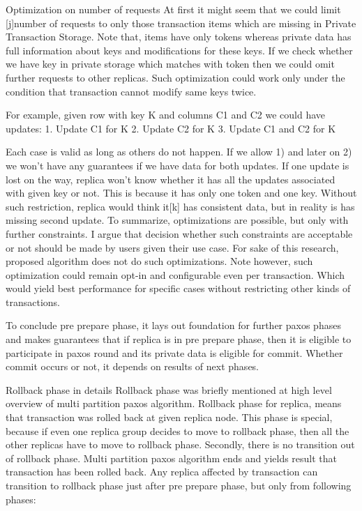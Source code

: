         Optimization on number of requests
At first it might seem that we could limit [j]number of requests to only those transaction items which are missing in Private Transaction Storage. Note that, items have only tokens whereas private data has full information about keys and modifications for these keys. If we check whether we have key in private storage which matches with token then we could omit further requests to other replicas. 
Such optimization could work only under the condition that transaction cannot modify same keys twice. 


For example, given row with key K and columns C1 and C2 we could have updates:
1. Update C1 for K
2. Update C2 for K
3. Update C1 and C2 for K


Each case is valid as long as others do not happen. If we allow 1) and later on 2) we won’t have any guarantees if we have data for both updates. If one update is lost on the way, replica won’t know whether it has all the updates associated with given key or not. This is because it has only one token and one key. Without such restriction, replica would think it[k] has consistent data, but in reality is has missing second update.
To summarize, optimizations are possible, but only with further constraints. I argue that decision whether such constraints are acceptable or not should be made by users given their use case. For sake of this research, proposed algorithm does not do such optimizations. Note however, such optimization could remain opt-in and configurable even per transaction. Which would yield best performance for specific cases without restricting other kinds of transactions.
        
To conclude pre prepare phase, it lays out foundation for further paxos phases and makes guarantees that if replica is in pre prepare phase, then it is eligible to participate in paxos round and its private data is eligible for commit. Whether commit occurs or not, it depends on results of next phases.


        Rollback phase in details
Rollback phase was briefly mentioned at high level overview of multi partition paxos algorithm. 
Rollback phase for replica, means that transaction was rolled back at given replica node. 
This phase is special, because if even one replica group decides to move to rollback phase, then all the other replicas have to move to rollback phase. Secondly, there is no transition out of rollback phase. Multi partition paxos algorithm ends and yields result that transaction has been rolled back.
Any replica affected by transaction can transition to rollback phase just after pre prepare phase, but only from following phases:


